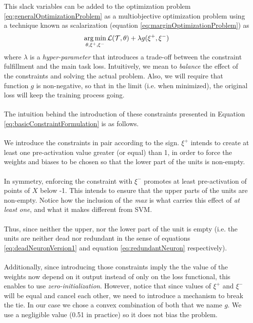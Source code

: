 This slack variables can be added to the optimization problem \ref{eq:generalOptimizationProblem} as a multiobjective optimization problem using a technique known as scalarization \cite{boyd} (equation \ref{eq:marginOptimizationProblem}) as
\begin{equation}\label{eq:marginOptimizationProblem}
\operatorname*{arg\,min}_{\theta,\xi^{+},\xi^{-}} \mathcal{L}(\mathcal{T},\theta) + \lambda g(\xi^{+},\xi^{-})
\end{equation}
where $\lambda$ is a \emph{hyper-parameter} that introduces a trade-off between the constraint fulfillment and the main task loss. Intuitively, we mean to \emph{balance} the effect of the constraints and solving the actual problem.
Also, we will require that function $g$ is non-negative, so that in the limit (i.e. when minimized), the original loss will keep the training process going. 
\\\\
The intuition behind the introduction of these constraints presented in Equation \ref{eq:basicConstraintFormulation} is as follows. 
\\\\
We introduce the constraints in pair according to the sign. $\xi^{+}$ intends to create at least one pre-activation value greater (or equal) than 1, in order to force the weights and biases to be chosen so that the lower part of the units is non-empty. 
\\\\
In symmetry, enforcing the constraint with $\xi^{-}$ promotes at least pre-activation of points of $X$ below -1. This intends to ensure that the upper parts of the units are non-empty. Notice how the inclusion of the \emph{max} is what carries this effect of \emph{at least one}, and what it makes different from SVM.
\\\\
Thus, since neither the upper, nor the lower part of the unit is empty (i.e. the units are neither dead nor redundant in the sense of equations \ref{eq:deadNeuronVersion1} and equation \ref{eq:redundantNeuron} respectively).
\\\\
Additionally, since introducing those constraints imply the the value of the weights now depend on it output instead of only on the loss functional, this enables to use \emph{zero-initialization}. However, notice that since values of $\xi^+$ and $\xi^-$ will be equal and cancel each other, we need to introduce a mechanism to break the tie. In our case we chose a convex combination of both that we name $g$. We use a negligible value (0.51 in practice) so it does not bias the problem.

